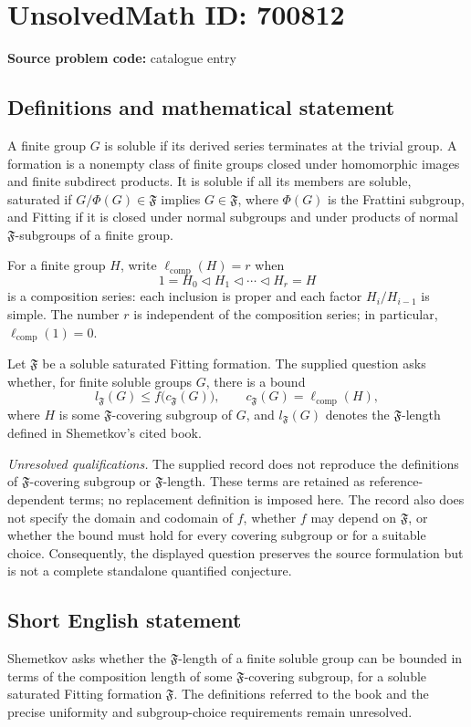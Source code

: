 \documentclass[11pt]{article}
\begin{document}
\section*{UnsolvedMath ID: 700812}
\textbf{Source problem code:} catalogue entry
\subsection{Definitions and mathematical statement}
A finite group \(G\) is soluble if its derived series terminates at the trivial group. A formation is a nonempty class of finite groups closed under homomorphic images and finite subdirect products. It is soluble if all its members are soluble, saturated if \(G/\Phi(G)\in\mathfrak F\) implies \(G\in\mathfrak F\), where \(\Phi(G)\) is the Frattini subgroup, and Fitting if it is closed under normal subgroups and under products of normal \(\mathfrak F\)-subgroups of a finite group.

For a finite group \(H\), write \(\ell_{\mathrm{comp}}(H)=r\) when
\[
1=H_0\triangleleft H_1\triangleleft\cdots\triangleleft H_r=H
\]
is a composition series: each inclusion is proper and each factor \(H_i/H_{i-1}\) is simple. The number \(r\) is independent of the composition series; in particular, \(\ell_{\mathrm{comp}}(1)=0\).

Let \(\mathfrak F\) be a soluble saturated Fitting formation. The supplied question asks whether, for finite soluble groups \(G\), there is a bound
\[
 l_{\mathfrak F}(G)\leq f\bigl(c_{\mathfrak F}(G)\bigr),
 \qquad c_{\mathfrak F}(G)=\ell_{\mathrm{comp}}(H),
\]
where \(H\) is some \(\mathfrak F\)-covering subgroup of \(G\), and \(l_{\mathfrak F}(G)\) denotes the \(\mathfrak F\)-length defined in Shemetkov's cited book.

\emph{Unresolved qualifications.} The supplied record does not reproduce the definitions of \(\mathfrak F\)-covering subgroup or \(\mathfrak F\)-length. These terms are retained as reference-dependent terms; no replacement definition is imposed here. The record also does not specify the domain and codomain of \(f\), whether \(f\) may depend on \(\mathfrak F\), or whether the bound must hold for every covering subgroup or for a suitable choice. Consequently, the displayed question preserves the source formulation but is not a complete standalone quantified conjecture.
\subsection{Short English statement}
Shemetkov asks whether the \(\mathfrak F\)-length of a finite soluble group can be bounded in terms of the composition length of some \(\mathfrak F\)-covering subgroup, for a soluble saturated Fitting formation \(\mathfrak F\). The definitions referred to the book and the precise uniformity and subgroup-choice requirements remain unresolved.
\end{document}
